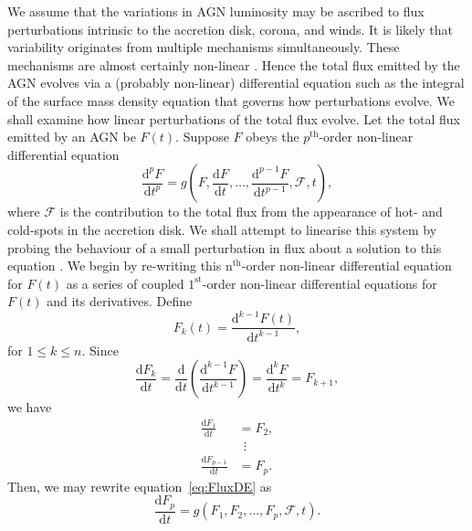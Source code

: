 \documentclass[a4paper,fleqn,usenatbib]{mnras}
\begin{document}
We assume that the variations in AGN luminosity may be ascribed to flux perturbations intrinsic to the accretion disk, corona, and winds. It is likely that variability originates from multiple mechanisms simultaneously. These mechanisms are almost certainly non-linear \citep{UMV05}. Hence the total flux emitted by the AGN evolves via a (probably non-linear) differential equation such as the integral of the surface mass density equation \citep[see][eq. 4]{LightmanEardley74} that governs how perturbations evolve. We shall examine how linear perturbations of the total flux evolve. Let the total flux emitted by an AGN be $F(t)$. Suppose $F$ obeys the $p^{\mathrm{th}}$-order non-linear differential equation
\begin{equation}\label{eq:FluxDE}
\frac{\mathrm{d}^{p}F}{\mathrm{d}t^{p}} = g(F,\frac{\mathrm{d}F}{\mathrm{d}t},\ldots,\frac{\mathrm{d}^{p-1}F}{\mathrm{d}t^{p-1}},\mathcal{F},t),
\end{equation}
where $\mathcal{F}$ is the contribution to the total flux from the appearance of hot- and cold-spots in the accretion disk. We shall attempt to linearise this system by probing the behaviour of a small perturbation in flux about a solution to this equation \citep{Wiberg,Stengel}. We begin by re-writing this n$^\mathrm{th}$-order non-linear differential equation for $F(t)$ as a series of coupled $1^\mathrm{st}$-order non-linear differential equations for $F(t)$ and its derivatives. Define
\begin{equation}\label{eq:GeneralRelationship}
F_{k}(t) = \frac{\mathrm{d}^{k-1}F(t)}{\mathrm{d}t^{k-1}},
\end{equation}
for $1 \leq k \leq n$. Since
\begin{equation}\label{eq:Linearize}
\frac{\mathrm{d}F_{k}}{\mathrm{d}t} = \frac{\mathrm{d}}{\mathrm{d}t}\left(\frac{\mathrm{d}^{k-1}F}{\mathrm{d}t^{k-1}}\right) = \frac{\mathrm{d}^{k}F}{\mathrm{d}t^{k}} = F_{k+1},
\end{equation} we have
\begin{equation}\label{eq:1stOrderSystem}
\begin{aligned}
\frac{\mathrm{d}F_{1}}{\mathrm{d}t} &= F_{2}, \\
&\ \ \vdots \\
\frac{\mathrm{d}F_{p-1}}{\mathrm{d}t} &= F_{p}.
\end{aligned}
\end{equation}
Then, we may rewrite equation~\eqref{eq:FluxDE} as
\begin{equation}\label{eq:1stOrderNonLinearDE}
\frac{\mathrm{d}F_{p}}{\mathrm{d}t} = g(F_{1},F_{2},\ldots,F_{p},\mathcal{F},t).
\end{equation}
\end{document}
